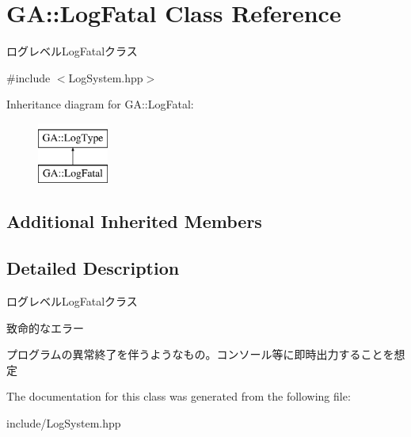 \hypertarget{class_g_a_1_1_log_fatal}{}\section{GA\+::Log\+Fatal Class Reference}
\label{class_g_a_1_1_log_fatal}


ログレベル\+Log\+Fatalクラス  




{\ttfamily \#include $<$Log\+System.\+hpp$>$}

Inheritance diagram for GA\+::Log\+Fatal\+:\begin{figure}[H]
\begin{center}
\leavevmode
\includegraphics[height=2.000000cm]{class_g_a_1_1_log_fatal}
\end{center}
\end{figure}
\subsection*{Additional Inherited Members}


\subsection{Detailed Description}
ログレベル\+Log\+Fatalクラス 

致命的なエラー

プログラムの異常終了を伴うようなもの。コンソール等に即時出力することを想定 

The documentation for this class was generated from the following file\+:\begin{DoxyCompactItemize}
\item 
include/Log\+System.\+hpp\end{DoxyCompactItemize}
